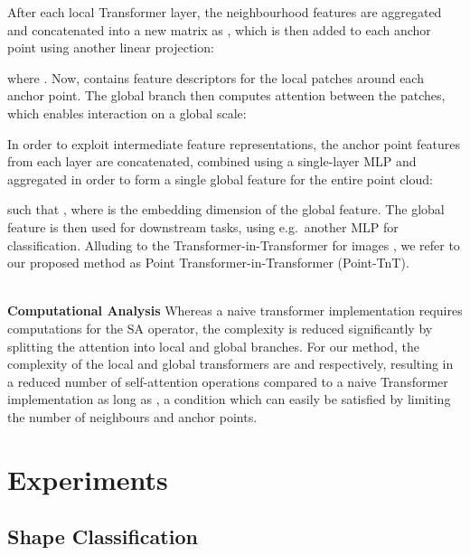 \documentclass[a4paper,conference]{IEEEtran}
\begin{document}
After each local Transformer layer, the neighbourhood features are aggregated and concatenated into a new matrix as , which is then added to each anchor point using another linear projection:


where . Now,  contains feature descriptors for the local patches around each anchor point. The global branch then computes attention between the patches, which enables interaction on a global scale:



In order to exploit intermediate feature representations, the anchor point features from each layer are concatenated, combined using a single-layer MLP and aggregated in order to form a single global feature for the entire point cloud:


such that , where  is the embedding dimension of the global feature. The global feature is then used for downstream tasks, using e.g.\ another MLP for classification. Alluding to the Transformer-in-Transformer for images \cite{han2021transformer}, we refer to our proposed method as Point Transformer-in-Transformer (Point-TnT). \\~\

\noindent \textbf{Computational Analysis} Whereas a naive transformer implementation requires  computations for the SA operator, the complexity is reduced significantly by splitting the attention into local and global branches. For our method, the complexity of the local and global transformers are  and  respectively, resulting in a reduced number of self-attention operations compared to a naive Transformer implementation as long as , a condition which can easily be satisfied by limiting the number of neighbours and anchor points. 


\section{Experiments}

\subsection{Shape Classification}
\end{document}
